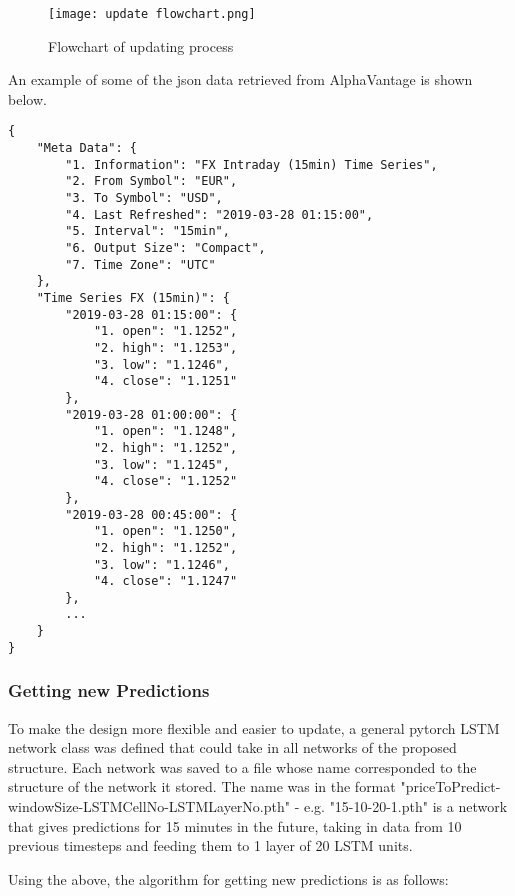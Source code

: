             \begin{figure}[h]
                \centering
                \texttt{[image: update flowchart.png]}
                \caption{Flowchart of updating process}
                \label{fig:update_flowchart}
            \end{figure}
            
            An example of some of the json data retrieved from AlphaVantage is shown below. 

            \begin{verbatim}
{
    "Meta Data": {
        "1. Information": "FX Intraday (15min) Time Series",
        "2. From Symbol": "EUR",
        "3. To Symbol": "USD",
        "4. Last Refreshed": "2019-03-28 01:15:00",
        "5. Interval": "15min",
        "6. Output Size": "Compact",
        "7. Time Zone": "UTC"
    },
    "Time Series FX (15min)": {
        "2019-03-28 01:15:00": {
            "1. open": "1.1252",
            "2. high": "1.1253",
            "3. low": "1.1246",
            "4. close": "1.1251"
        },
        "2019-03-28 01:00:00": {
            "1. open": "1.1248",
            "2. high": "1.1252",
            "3. low": "1.1245",
            "4. close": "1.1252"
        },
        "2019-03-28 00:45:00": {
            "1. open": "1.1250",
            "2. high": "1.1252",
            "3. low": "1.1246",
            "4. close": "1.1247"
        },
        ...
    }
}
            \end{verbatim}

            \subsubsection{Getting new Predictions}
        
            To make the design more flexible and easier to update, a general pytorch LSTM network class was defined that could take in all networks of the proposed structure. Each network was saved to a file whose name corresponded to the structure of the network it stored. The name was in the format "priceToPredict-windowSize-LSTMCellNo-LSTMLayerNo.pth" - e.g. "15-10-20-1.pth" is a network that gives predictions for 15 minutes in the future, taking in data from 10 previous timesteps and feeding them to 1 layer of 20 LSTM units. 

            \vspace{3mm}\linebreak
            Using the above, the algorithm for getting new predictions is as follows:


